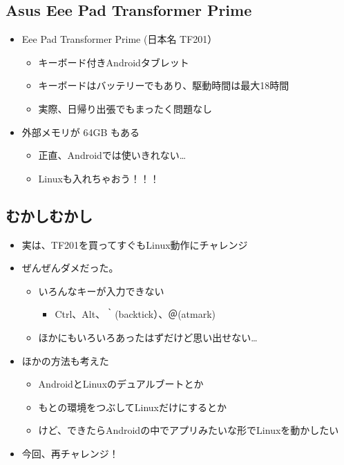 \documentclass[mingoth,a4paper]{jsarticle}
\begin{document}
\subsection{Asus Eee Pad Transformer Prime}
\begin{itemize}
 \item Eee Pad Transformer Prime (日本名 TF201）
       \begin{itemize}
        \item キーボード付きAndroidタブレット
        \item キーボードはバッテリーでもあり、駆動時間は最大18時間
        \item 実際、日帰り出張でもまったく問題なし
       \end{itemize}
 \item 外部メモリが 64GB もある
       \begin{itemize}
        \item 正直、Androidでは使いきれない…
        \item Linuxも入れちゃおう！！！
       \end{itemize}
\end{itemize}

\subsection{むかしむかし}
\begin{itemize}
 \item 実は、TF201を買ってすぐもLinux動作にチャレンジ
 \item ぜんぜんダメだった。
       \begin{itemize}
        \item いろんなキーが入力できない
              \begin{itemize}
               \item Ctrl、Alt、｀(backtick）、＠(atmark)
              \end{itemize}
        \item ほかにもいろいろあったはずだけど思い出せない…
       \end{itemize}
 \item ほかの方法も考えた
       \begin{itemize}
        \item AndroidとLinuxのデュアルブートとか
        \item もとの環境をつぶしてLinuxだけにするとか
        \item けど、できたらAndroidの中でアプリみたいな形でLinuxを動かしたい
       \end{itemize}
 \item 今回、再チャレンジ！
\end{itemize}
\end{document}
